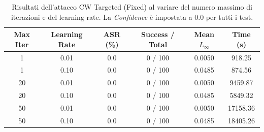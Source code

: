 \documentclass[a4paper, 12pt]{article}
\begin{document}
\begin{table}[h]
    \centering
    \begin{tabular}{cccccc}
        \toprule
        \textbf{Max Iter} & \textbf{Learning Rate} & \textbf{ASR (\%)} & \textbf{Success / Total} & \textbf{Mean $L_\infty$} & \textbf{Time (s)} \\
        \midrule
        1  & 0.01 & 0.0 & 0 / 100 & 0.0050 & 918.25 \\
        1  & 0.10 & 0.0 & 0 / 100 & 0.0485 & 874.56 \\
        20 & 0.01 & 0.0 & 0 / 100 & 0.0050 & 9459.87 \\
        20 & 0.10 & 0.0 & 0 / 100 & 0.0485 & 5849.32 \\
        50 & 0.01 & 0.0 & 0 / 100 & 0.0050 & 17158.36 \\
        50 & 0.10 & 0.0 & 0 / 100 & 0.0485 & 18405.26 \\
        \bottomrule
    \end{tabular}
    \caption{Risultati dell'attacco CW Targeted (Fixed) al variare del numero massimo di iterazioni e del learning rate. La \textit{Confidence} è impostata a 0.0 per tutti i test.}
    \label{tab:cw_targeted_fixed_results}
\end{table}
\end{document}
